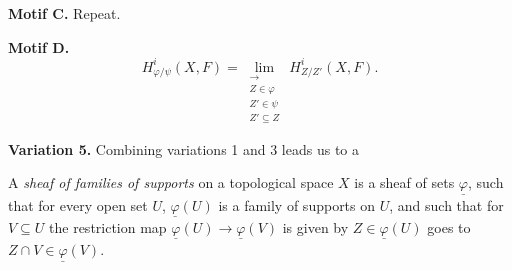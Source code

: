 \medskip\noindent\textbf{Motif C.} Repeat.

\medskip\noindent\textbf{Motif D.}
\[
H_{\varphi/\psi}^{i}(X,F)=\lim_{\substack{\longrightarrow \\ Z\in\varphi \\ Z'\in\psi\\ Z'\subseteq Z}}\,H_{Z/Z'}^{i}(X,F).
\]

\medskip\noindent\textbf{Variation 5.}
Combining variations 1 and 3 leads us to a

\begin{definition*}
A \emph{sheaf of families of supports} on a topological space $X$ is a sheaf of sets $\underline{\varphi}$, such that for every open set $U$, $\underline{\varphi}(U)$ is a family of supports on $U$, and such that for $V\subseteq U$ the restriction map $\underline{\varphi}(U)\to\underline{\varphi}(V)$ is given by $Z\in\underline{\varphi}(U)$ goes to $Z\cap V\in\underline{\varphi}(V)$.
\end{definition*}

